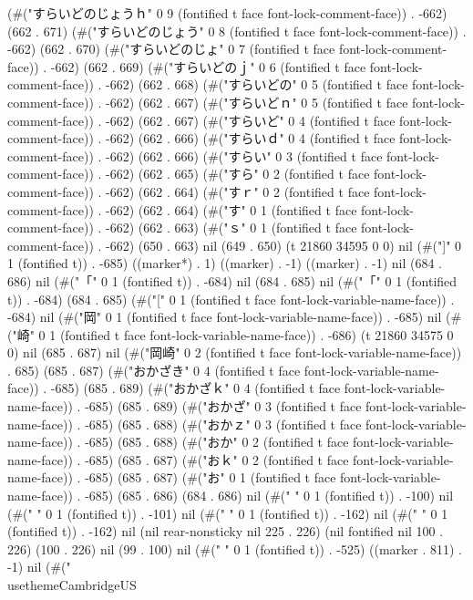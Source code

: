 (#("すらいどのじょうｈ" 0 9 (fontified t face font-lock-comment-face)) . -662) (662 . 671) (#("すらいどのじょう" 0 8 (fontified t face font-lock-comment-face)) . -662) (662 . 670) (#("すらいどのじょ" 0 7 (fontified t face font-lock-comment-face)) . -662) (662 . 669) (#("すらいどのｊ" 0 6 (fontified t face font-lock-comment-face)) . -662) (662 . 668) (#("すらいどの" 0 5 (fontified t face font-lock-comment-face)) . -662) (662 . 667) (#("すらいどｎ" 0 5 (fontified t face font-lock-comment-face)) . -662) (662 . 667) (#("すらいど" 0 4 (fontified t face font-lock-comment-face)) . -662) (662 . 666) (#("すらいｄ" 0 4 (fontified t face font-lock-comment-face)) . -662) (662 . 666) (#("すらい" 0 3 (fontified t face font-lock-comment-face)) . -662) (662 . 665) (#("すら" 0 2 (fontified t face font-lock-comment-face)) . -662) (662 . 664) (#("すｒ" 0 2 (fontified t face font-lock-comment-face)) . -662) (662 . 664) (#("す" 0 1 (fontified t face font-lock-comment-face)) . -662) (662 . 663) (#("ｓ" 0 1 (fontified t face font-lock-comment-face)) . -662) (650 . 663) nil (649 . 650) (t 21860 34595 0 0) nil (#("]" 0 1 (fontified t)) . -685) ((marker*) . 1) ((marker) . -1) ((marker) . -1) nil (684 . 686) nil (#("「" 0 1 (fontified t)) . -684) nil (684 . 685) nil (#("「" 0 1 (fontified t)) . -684) (684 . 685) (#("[" 0 1 (fontified t face font-lock-variable-name-face)) . -684) nil (#("岡" 0 1 (fontified t face font-lock-variable-name-face)) . -685) nil (#("崎" 0 1 (fontified t face font-lock-variable-name-face)) . -686) (t 21860 34575 0 0) nil (685 . 687) nil (#("岡崎" 0 2 (fontified t face font-lock-variable-name-face)) . 685) (685 . 687) (#("おかざき" 0 4 (fontified t face font-lock-variable-name-face)) . -685) (685 . 689) (#("おかざｋ" 0 4 (fontified t face font-lock-variable-name-face)) . -685) (685 . 689) (#("おかざ" 0 3 (fontified t face font-lock-variable-name-face)) . -685) (685 . 688) (#("おかｚ" 0 3 (fontified t face font-lock-variable-name-face)) . -685) (685 . 688) (#("おか" 0 2 (fontified t face font-lock-variable-name-face)) . -685) (685 . 687) (#("おｋ" 0 2 (fontified t face font-lock-variable-name-face)) . -685) (685 . 687) (#("お" 0 1 (fontified t face font-lock-variable-name-face)) . -685) (685 . 686) (684 . 686) nil (#(" " 0 1 (fontified t)) . -100) nil (#(" " 0 1 (fontified t)) . -101) nil (#(" " 0 1 (fontified t)) . -162) nil (#(" " 0 1 (fontified t)) . -162) nil (nil rear-nonsticky nil 225 . 226) (nil fontified nil 100 . 226) (100 . 226) nil (99 . 100) nil (#("
" 0 1 (fontified t)) . -525) ((marker . 811) . -1) nil (#("
\\usetheme{CambridgeUS}
